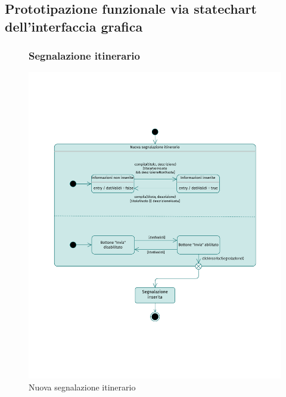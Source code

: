\documentclass{natourDoc}
\begin{document}
\newpage
\subsection{Prototipazione funzionale via statechart dell'interfaccia grafica}

\begin{figure}[!htbp]
	\subsubsection{Segnalazione itinerario}
	\centering
	\includegraphics[width=\textwidth, page=1]{./diagrams/statechart.pdf}
	\caption{Nuova segnalazione itinerario}
\end{figure}
\FloatBarrier

\newpage
\end{document}
